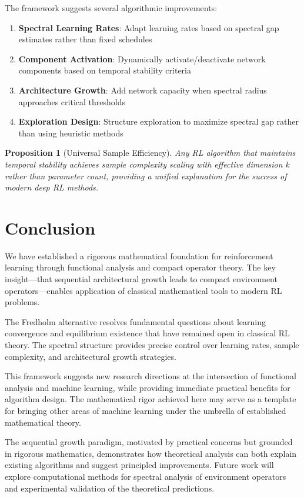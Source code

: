 \documentclass[11pt]{article}
\newtheorem{proposition}{Proposition}
\begin{document}
The framework suggests several algorithmic improvements:

\begin{enumerate}
\item \textbf{Spectral Learning Rates}: Adapt learning rates based on spectral gap estimates rather than fixed schedules
\item \textbf{Component Activation}: Dynamically activate/deactivate network components based on temporal stability criteria
\item \textbf{Architecture Growth}: Add network capacity when spectral radius approaches critical thresholds
\item \textbf{Exploration Design}: Structure exploration to maximize spectral gap rather than using heuristic methods
\end{enumerate}

\begin{proposition}[Universal Sample Efficiency]
Any RL algorithm that maintains temporal stability achieves sample complexity scaling with effective dimension $k$ rather than parameter count, providing a unified explanation for the success of modern deep RL methods.
\end{proposition}

\section{Conclusion}

We have established a rigorous mathematical foundation for reinforcement learning through functional analysis and compact operator theory. The key insight—that sequential architectural growth leads to compact environment operators—enables application of classical mathematical tools to modern RL problems.

The Fredholm alternative resolves fundamental questions about learning convergence and equilibrium existence that have remained open in classical RL theory. The spectral structure provides precise control over learning rates, sample complexity, and architectural growth strategies.

This framework suggests new research directions at the intersection of functional analysis and machine learning, while providing immediate practical benefits for algorithm design. The mathematical rigor achieved here may serve as a template for bringing other areas of machine learning under the umbrella of established mathematical theory.

The sequential growth paradigm, motivated by practical concerns but grounded in rigorous mathematics, demonstrates how theoretical analysis can both explain existing algorithms and suggest principled improvements. Future work will explore computational methods for spectral analysis of environment operators and experimental validation of the theoretical predictions.
\end{document}
